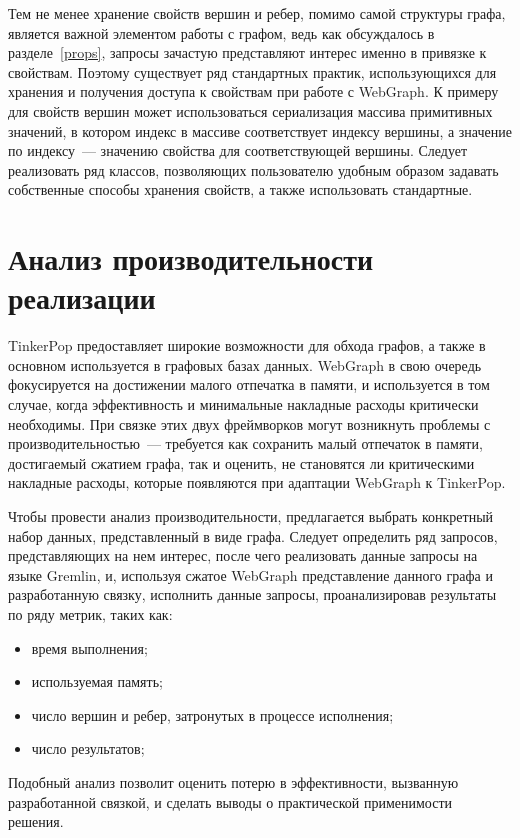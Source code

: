 \documentclass[times,specification,annotation]{itmo-student-thesis}
\begin{document}
Тем не менее хранение свойств вершин и ребер, помимо самой структуры графа, является важной элементом работы с графом, ведь как обсуждалось в разделе~\ref{props}, запросы зачастую представляют интерес именно в привязке к свойствам. Поэтому существует ряд стандартных практик, использующихся для хранения и получения доступа к свойствам при работе с WebGraph.
К примеру для свойств вершин может использоваться сериализация массива примитивных значений, в котором индекс в массиве соответствует индексу вершины, а значение по индексу~--- значению свойства для соответствующей вершины. Следует реализовать ряд классов, позволяющих пользователю удобным образом задавать собственные способы хранения свойств, а также использовать стандартные.

\section{Анализ производительности реализации}

TinkerPop предоставляет широкие возможности для обхода графов, а также в основном используется в графовых базах данных. WebGraph в свою очередь фокусируется на достижении малого отпечатка в памяти, и используется в том случае, когда эффективность и минимальные накладные расходы критически необходимы.
При связке этих двух фреймворков могут возникнуть проблемы с производительностью~--- требуется как сохранить малый отпечаток в памяти, достигаемый сжатием графа, так и оценить, не становятся ли критическими накладные расходы, которые появляются при адаптации WebGraph к TinkerPop.

Чтобы провести анализ производительности, предлагается выбрать конкретный набор данных, представленный в виде графа. Следует определить ряд запросов, представляющих на нем интерес, после чего реализовать данные запросы на языке Gremlin, и, используя сжатое WebGraph представление данного графа и разработанную связку, исполнить данные запросы, проанализировав результаты по ряду метрик, таких как:

\begin{itemize}
    \item время выполнения;
    \item используемая память;
    \item число вершин и ребер, затронутых в процессе исполнения;
    \item число результатов;
\end{itemize}

Подобный анализ позволит оценить потерю в эффективности, вызванную разработанной связкой, и сделать выводы о практической применимости решения.
\end{document}

